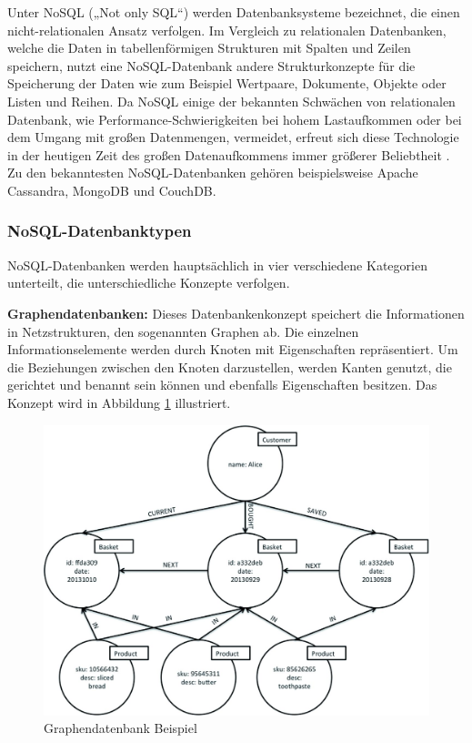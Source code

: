Unter NoSQL („Not only SQL“) werden Datenbanksysteme bezeichnet, die einen nicht-relationalen Ansatz verfolgen. Im Vergleich zu relationalen Datenbanken, welche die Daten in tabellenförmigen Strukturen mit Spalten und Zeilen speichern, nutzt eine NoSQL-Datenbank andere Strukturkonzepte für die Speicherung der Daten wie zum Beispiel Wertpaare, Dokumente, Objekte oder Listen und Reihen. Da NoSQL einige der bekannten Schwächen von relationalen Datenbank, wie Performance-Schwierigkeiten bei hohem Lastaufkommen oder bei dem Umgang mit großen Datenmengen, vermeidet, erfreut sich diese Technologie in der heutigen Zeit des großen Datenaufkommens immer größerer Beliebtheit \cite{DB1}.
Zu den bekanntesten NoSQL-Datenbanken gehören beispielsweise Apache Cassandra, MongoDB und CouchDB.
\newline

\subsubsection{NoSQL-Datenbanktypen}
NoSQL-Datenbanken werden hauptsächlich in vier verschiedene Kategorien unterteilt, die unterschiedliche Konzepte verfolgen.
\newline

\noindent
{}
\textbf{Graphendatenbanken:}
Dieses Datenbankenkonzept speichert die Informationen in Netzstrukturen, den sogenannten Graphen ab. Die einzelnen Informationselemente werden durch Knoten mit Eigenschaften repräsentiert. Um die Beziehungen zwischen den Knoten darzustellen, werden Kanten genutzt, die gerichtet und benannt sein können und ebenfalls Eigenschaften besitzen. Das Konzept wird in Abbildung \ref{Graphendatenbank} illustriert.\\

\begin{figure}[tbt]
\centering
\includegraphics[]{images/graphikdatabase.jpg}
\caption[Graphendatenbank Beispiel]{Graphendatenbank Beispiel \protect \footnotemark}
\label{Graphendatenbank}
\end{figure}

